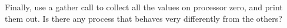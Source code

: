   Finally, use a gather call to collect all the values on processor
  zero, and print them out. Is there any process that behaves very
  differently from the others?
